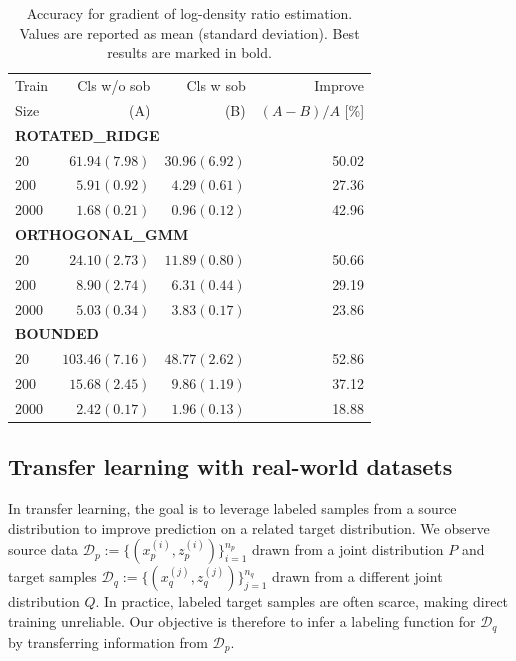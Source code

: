 \documentclass[11pt]{article}
\theoremstyle{plain}
\theoremstyle{definition}
\theoremstyle{remark}
\begin{document}
\begin{table}[tbp]
\centering \small
\caption{Accuracy for gradient of log-density ratio estimation.
Values are reported as mean (standard deviation).
Best results are marked in bold.}
\label{tab:grouped_results_compact}
\begin{tabular}{lrrr}
\toprule
Train & Cls w/o sob & Cls w sob & Improve \\
 Size          & (A)         & (B)       & $(A-B)/A$ [\%] \\
\midrule
\multicolumn{4}{l}{\textbf{ROTATED\_RIDGE}} \\
20   & $61.94(7.98)$ & $\mathbf{30.96(6.92)}$ & 50.02 \\
200  & $5.91(0.92)$  & $\mathbf{4.29(0.61)}$  & 27.36 \\
2000 & $1.68(0.21)$  & $\mathbf{0.96(0.12)}$  & 42.96 \\
\midrule
\multicolumn{4}{l}{\textbf{ORTHOGONAL\_GMM}} \\
20   & $24.10(2.73)$ & $\mathbf{11.89(0.80)}$ & 50.66 \\
200  & $8.90(2.74)$  & $\mathbf{6.31(0.44)}$  & 29.19 \\
2000 & $5.03(0.34)$  & $\mathbf{3.83(0.17)}$  & 23.86 \\
\midrule
\multicolumn{4}{l}{\textbf{BOUNDED}} \\
20   & $103.46(7.16)$ & $\mathbf{48.77(2.62)}$ & 52.86 \\
200  & $15.68(2.45)$  & $\mathbf{9.86(1.19)}$  & 37.12 \\
2000 & $2.42(0.17)$   & $\mathbf{1.96(0.13)}$  & 18.88 \\
\bottomrule
\end{tabular}
\end{table}
\subsection{Transfer learning with real-world datasets}
In transfer learning, the goal is to leverage labeled samples from a source distribution to improve prediction on a related target distribution. We observe source data $\mathcal{D}_p:=\{(x_p^{(i)}, z_p^{(i)})\}_{i=1}^{n_p}$ drawn from a joint distribution $P$ and target samples $\mathcal{D}_q:=\{(x_q^{(j)}, z_q^{(j)})\}_{j=1}^{n_q}$ drawn from a different joint distribution $Q$.
In practice, labeled target samples are often scarce, making direct training unreliable. Our objective is therefore to infer a labeling function for
$\mathcal{D}_q$ by transferring information from $\mathcal{D}_p$.
\end{document}
